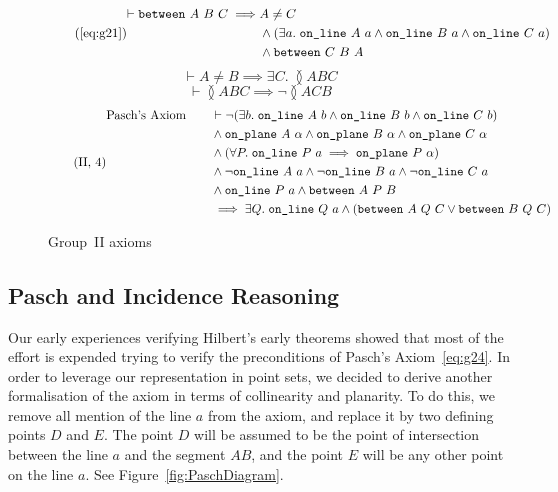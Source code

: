 \begin{figure}
\begin{equation}
 \tag{\ref{eq:g21}}
  \begin{split}
    \vdash\between{A}{B}{C} \implies & A \neq C\\
                               & \wedge (\exists a.\; \code{on\_line}\ A\ a \wedge \code{on\_line}\ B\ a \wedge \code{on\_line}\ C\ a)\\
                               & \wedge \between{C}{B}{A}
  \end{split}
\end{equation}
\begin{equation}\label{eq:g22}
  \tag{II,~2}
  \vdash A \neq B \implies \exists C.\; \between{A}{B}{C}
\end{equation}
\begin{equation}\label{eq:g23}
  \tag{II,~3}
  \vdash\between{A}{B}{C} \implies \neg\between{A}{C}{B}
\end{equation}
\begin{equation}\label{eq:g24}
  \tag{II,~4}
  \begin{split}
    \text{Pasch's Axiom}\qquad & \vdash\neg(\exists b.\; \texttt{on\_line}\ A\ b\wedge \texttt{on\_line}\ B\ b\wedge \texttt{on\_line}\ C\ b)\\
    & \wedge \texttt{on\_plane}\ A\ \alpha \wedge \texttt{on\_plane}\ B\ \alpha \wedge \texttt{on\_plane}\ C\ \alpha \\
    & \wedge (\forall P.\; \texttt{on\_line}\ P\ a \implies \texttt{on\_plane}\ P\ \alpha)\\
    & \wedge \neg\texttt{on\_line}\ A\ a \wedge \neg\texttt{on\_line}\ B\ a \wedge \neg\texttt{on\_line}\ C\ a\\
    & \wedge \texttt{on\_line}\ P\ a \wedge \texttt{between}\ A\ P\ B\\
    & \implies \exists Q.\; \texttt{on\_line}\ Q\ a \wedge (\texttt{between}\ A\ Q\ C \vee \texttt{between}\ B\ Q\ C)
  \end{split}
\end{equation}
\caption{Group~II axioms}
\label{fig:Group2Axioms}
\end{figure}

\subsection{Pasch and Incidence Reasoning}
Our early experiences verifying Hilbert's early theorems showed that most of the effort is expended trying to verify the preconditions of Pasch's Axiom~\eqref{eq:g24}. In order to leverage our representation in point sets, we decided to derive another formalisation of the axiom in terms of collinearity and planarity. To do this, we remove all mention of the line $a$ from the axiom, and replace it by two defining points $D$ and $E$. The point $D$ will be assumed to be the point of intersection between the line $a$ and the segment $AB$, and the point $E$ will be any other point on the line $a$. See Figure~\ref{fig:PaschDiagram}.


